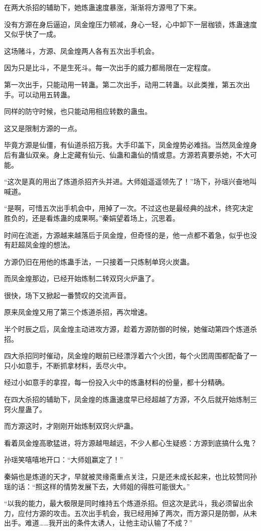 \begin{this_body}
在两大杀招的辅助下，她炼蛊速度暴涨，渐渐将方源甩了下来。

没有方源在身后逼迫，凤金煌压力顿减，身心一轻，心中卸下一层枷锁，炼蛊速度又似乎快了一成。

这场赌斗，方源、凤金煌两人各有五次出手机会。

因为只是比斗，不是生死斗。每一次出手的威力都局限在一定程度。

第一次出手，只能动用一转蛊。第二次出手，动用二转蛊。以此类推，第五次出手。可以动用五转蛊。

同样的防守时候，也只能动用相应转数的蛊虫。

这又是限制方源的一点。

毕竟方源是仙僵，有仙道杀招万我。大手印盖下，凤金煌势必难挡。当然凤金煌身后有蛊仙双亲。身上定藏有仙元、仙蛊和蛊仙的情或意。方源若真要杀她，不大可能。

“这次是真的用出了炼道杀招齐头并进。大师姐遥遥领先了！”场下，孙瑶兴奋地叫喊道。

“是啊，可惜五次出手机会中，用掉了一次。不过这也是最经典的战术，终究决定胜负的，还是看炼蛊的成果啊。”秦娟望着场上，沉思着。

时间在流逝，方源越来越落后于凤金煌，但奇怪的是，他一点都不着急，似乎也没有赶超凤金煌的想法。

方源仍旧在用他的炼蛊手法，一只接着一只炼制单窍火炭蛊。

而凤金煌那边，已经开始炼制二转双窍火炉蛊了。

很快，场下又掀起一番赞叹的交流声音。

原来凤金煌又用了第三个炼道杀招，再次增速。

半个时辰之后，凤金煌主动进攻方源，趁着方源防御的时候，她催动第四个炼道杀招。

四大杀招同时催动，凤金煌的眼前已经漂浮着六个火团，每个火团周围都配备了一只小如意手，不断抓拿材料，丢尽火中。

经过小如意手的拿捏，每一份投入火中的炼蛊材料的份量，都十分精确。

在四大杀招的辅助下，凤金煌的炼蛊速度早已经超越了方源，不久后就开始炼制三窍火屋蛊了。

而方源这时，才刚刚开始炼制双窍火炉蛊。

看着凤金煌高歌猛进，将方源越甩越远，不少人都心生疑惑：方源到底搞什么鬼？

孙瑶笑嘻嘻地开口：“大师姐赢定了！”

秦娟也是炼道的天才，早就被灵缘斋重点关注，只是还未成长起来，也比较赞同孙瑶的话：“照这样的情势发展下去，大师姐的得胜可能很大。”

“以我的能力，最大极限是同时维持五个炼道杀招。但这次是武斗，我必须留出余力，应付方源的攻击。五次出手机会，我已经用掉了两次，而方源只是防御，从未出手。难道……我开出的条件太诱人，让他主动认输了不成？”


\end{this_body}

